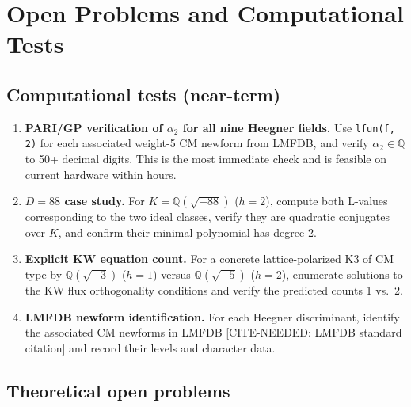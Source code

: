 \documentclass[12pt,a4paper]{article}
\theoremstyle{plain}
\theoremstyle{definition}
\newcommand{\Q}{\mathbb{Q}}
\begin{document}
\section{Open Problems and Computational Tests}
\label{sec:open}

\subsection{Computational tests (near-term)}

\begin{enumerate}
  \item \textbf{PARI/GP verification of $\alpha_2$ for all nine Heegner fields.}
    Use \texttt{lfun(f, 2)} for each associated weight-5 CM newform from
    LMFDB, and verify $\alpha_2 \in \Q$ to 50+ decimal digits. This is the
    most immediate check and is feasible on current hardware within hours.

  \item \textbf{$D=88$ case study.}
    For $K = \Q(\sqrt{-88})$ ($h=2$), compute both L-values corresponding
    to the two ideal classes, verify they are quadratic conjugates over $K$,
    and confirm their minimal polynomial has degree 2.

  \item \textbf{Explicit KW equation count.}
    For a concrete lattice-polarized K3 of CM type by $\Q(\sqrt{-3})$
    ($h=1$) versus $\Q(\sqrt{-5})$ ($h=2$), enumerate solutions to the
    KW flux orthogonality conditions and verify the predicted counts 1 vs.\ 2.

  \item \textbf{LMFDB newform identification.}
    For each Heegner discriminant, identify the associated CM newforms in
    LMFDB \cite{LMFDB} [CITE-NEEDED: LMFDB standard citation] and record
    their levels and character data.
\end{enumerate}

\subsection{Theoretical open problems}
\end{document}
